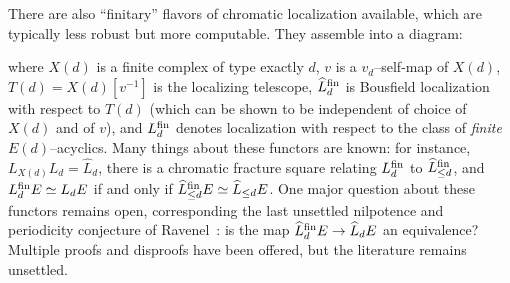 \begin{remark}
There are also ``finitary'' flavors of chromatic localization available, which are typically less robust but more computable.  They assemble into a diagram:
\begin{center}
\end{center}
where $X(d)$ is a finite complex of type exactly $d$, $v$ is a $v_d$--self-map of $X(d)$, $T(d) = X(d)[v^{-1}]$ is the localizing telescope, $\widehat L_d^{\mathrm{fin}}$ is Bousfield localization with respect to $T(d)$ (which can be shown to be independent of choice of $X(d)$ and of $v$), and $L_d^{\mathrm{fin}}$ denotes localization with respect to the class of \emph{finite} $E(d)$--acyclics.  Many things about these functors are known: for instance, $L_{X(d)} L_d = \widehat L_d$, there is a chromatic fracture square relating $L_d^{\mathrm{fin}}$ to $\widehat L_{\le d}^{\mathrm{fin}}$, and $L_d^{\mathrm{fin}} E \simeq L_d E$ if and only if $\widehat L_{\le d}^{\mathrm{fin}} E \simeq \widehat L_{\le d} E$.  One major question about these functors remains open, corresponding the last unsettled nilpotence and periodicity conjecture of Ravenel~\cite[Conjecture 10.5]{RavenelLocalizationWRTPeriodic}: is the map $\widehat L_d^{\mathrm{fin}} E \to \widehat L_d E$ an equivalence?  Multiple proofs and disproofs have been offered, but the literature remains unsettled.
\end{remark}







